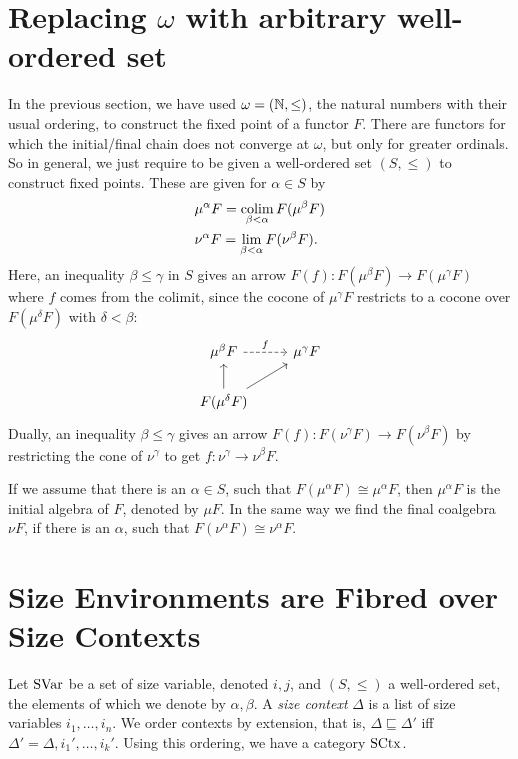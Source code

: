 \documentclass[runningheads,envcountsame,envcountsect,orivec]{llncs}
\begin{document}
\section{Replacing $\omega$ with arbitrary well-ordered set}
\label{sec:fp-well-ordered-set}
In the previous section, we have used $\omega = (\mathbb{N}, \leq)$, the natural numbers
with their usual ordering, to construct the fixed point of a functor $F$.
There are functors for which the initial/final chain does not converge at
$\omega$, but only for greater ordinals.
So in general, we just require to be given a well-ordered set $(S, \leq)$
to construct fixed points.
These are given for $\alpha \in S$ by
\begin{align*}
  & \mu^{\alpha} F = \operatorname*{colim}_{\beta < \alpha} F(\mu^{\beta} F) \\
  & \nu^{\alpha} F = \lim_{\beta < \alpha} F(\nu^{\beta} F).
\end{align*}
Here, an inequality $\beta \leq \gamma$ in $S$ gives an arrow
$F(f) : F(\mu^{\beta} F) \to F(\mu^{\gamma} F)$ where $f$ comes from the
colimit, since the cocone of $\mu^{\gamma}F$ restricts to a cocone
over $F(\mu^{\delta}F)$ with $\delta < \beta$:
\begin{equation*}
  \begin{tikzcd}
    \mu^{\beta} F \rar[dashed]{f} & \mu^{\gamma}F \\
    F(\mu^{\delta}F) \uar{} \arrow{ur}{}
  \end{tikzcd}
\end{equation*}
Dually, an inequality $\beta \leq \gamma$ gives an arrow
$F(f) : F(\nu^{\gamma} F) \to F(\nu^{\beta} F)$ by restricting the cone of
$\nu^{\gamma}$ to get $f : \nu^{\gamma} \to \nu^{\beta}F$.

If we assume that there is an $\alpha \in S$, such that
$F(\mu^{\alpha}F) \cong \mu^{\alpha}F$, then $\mu^{\alpha}F$ is the initial
algebra of $F$, denoted by $\mu F$.
In the same way we find the final coalgebra $\nu F$, if there is an $\alpha$,
such that $F(\nu^{\alpha} F) \cong \nu^{\alpha}F$.

\section{Size Environments are Fibred over Size Contexts}
\label{sec:size-env}

Let $\mathrm{SVar}$ be a set of size variable, denoted $i, j$, and $(S, \leq)$ a
well-ordered set, the elements of which we denote by $\alpha, \beta$.
A \emph{size context} $\Delta$ is a list of size variables $i_1, \dotsc, i_n$.
We order contexts by extension, that is, $\Delta \sqsubseteq \Delta'$ iff
$\Delta' = \Delta, i_1', \dotsc, i_k'$.
Using this ordering, we have a category $\mathrm{SCtx}$.
\end{document}
